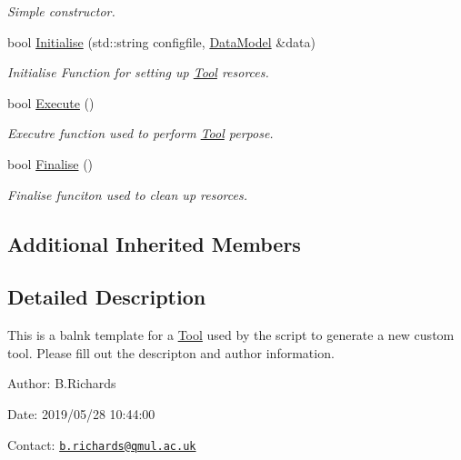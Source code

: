 \begin{DoxyCompactItemize}
\begin{DoxyCompactList}\small\item\em Simple constructor. \end{DoxyCompactList}\item 
bool \hyperlink{classMyTool_a3bf60061195a18542c4cfb2916b9dad9}{Initialise} (std\-::string configfile, \hyperlink{classDataModel}{Data\-Model} \&data)
\begin{DoxyCompactList}\small\item\em Initialise Function for setting up \hyperlink{classTool}{Tool} resorces. \end{DoxyCompactList}\item 
\hypertarget{classMyTool_a0a58122023af90b9200d0e71e89cfb36}{bool \hyperlink{classMyTool_a0a58122023af90b9200d0e71e89cfb36}{Execute} ()}\label{classMyTool_a0a58122023af90b9200d0e71e89cfb36}

\begin{DoxyCompactList}\small\item\em Executre function used to perform \hyperlink{classTool}{Tool} perpose. \end{DoxyCompactList}\item 
\hypertarget{classMyTool_a060ec6356451aa335d0de41093c9992f}{bool \hyperlink{classMyTool_a060ec6356451aa335d0de41093c9992f}{Finalise} ()}\label{classMyTool_a060ec6356451aa335d0de41093c9992f}

\begin{DoxyCompactList}\small\item\em Finalise funciton used to clean up resorces. \end{DoxyCompactList}\end{DoxyCompactItemize}
\subsection*{Additional Inherited Members}


\subsection{Detailed Description}
This is a balnk template for a \hyperlink{classTool}{Tool} used by the script to generate a new custom tool. Please fill out the descripton and author information.

\begin{DoxyParagraph}{Author\-:}
B.\-Richards 
\end{DoxyParagraph}
\begin{DoxyParagraph}{Date\-:}
2019/05/28 10\-:44\-:00 
\end{DoxyParagraph}
Contact\-: \href{mailto:b.richards@qmul.ac.uk}{\tt b.\-richards@qmul.\-ac.\-uk} 

